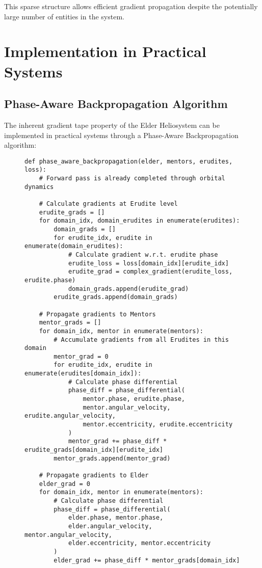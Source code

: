 This sparse structure allows efficient gradient propagation despite the potentially large number of entities in the system.

\section{Implementation in Practical Systems}

\subsection{Phase-Aware Backpropagation Algorithm}

The inherent gradient tape property of the Elder Heliosystem can be implemented in practical systems through a Phase-Aware Backpropagation algorithm:

\begin{figure}[h]
\begin{center}
\begin{minipage}{0.95\textwidth}
\begin{verbatim}
def phase_aware_backpropagation(elder, mentors, erudites, loss):
    # Forward pass is already completed through orbital dynamics
    
    # Calculate gradients at Erudite level
    erudite_grads = []
    for domain_idx, domain_erudites in enumerate(erudites):
        domain_grads = []
        for erudite_idx, erudite in enumerate(domain_erudites):
            # Calculate gradient w.r.t. erudite phase
            erudite_loss = loss[domain_idx][erudite_idx]
            erudite_grad = complex_gradient(erudite_loss, erudite.phase)
            domain_grads.append(erudite_grad)
        erudite_grads.append(domain_grads)
    
    # Propagate gradients to Mentors
    mentor_grads = []
    for domain_idx, mentor in enumerate(mentors):
        # Accumulate gradients from all Erudites in this domain
        mentor_grad = 0
        for erudite_idx, erudite in enumerate(erudites[domain_idx]):
            # Calculate phase differential
            phase_diff = phase_differential(
                mentor.phase, erudite.phase,
                mentor.angular_velocity, erudite.angular_velocity,
                mentor.eccentricity, erudite.eccentricity
            )
            mentor_grad += phase_diff * erudite_grads[domain_idx][erudite_idx]
        mentor_grads.append(mentor_grad)
    
    # Propagate gradients to Elder
    elder_grad = 0
    for domain_idx, mentor in enumerate(mentors):
        # Calculate phase differential
        phase_diff = phase_differential(
            elder.phase, mentor.phase,
            elder.angular_velocity, mentor.angular_velocity,
            elder.eccentricity, mentor.eccentricity
        )
        elder_grad += phase_diff * mentor_grads[domain_idx]
    

\end{verbatim}
\end{minipage}
\end{center}
\end{figure}
